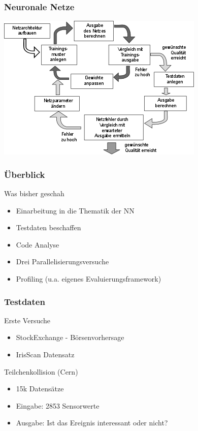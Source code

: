 \documentclass[18pt]{beamer}
\begin{document}
	\begin{frame}[c]\frametitle{Neuronale Netze}
		\begin{center}
		\includegraphics[scale=.7]{images/workflow.png}
		\end{center}
	\end{frame}		

	\begin{frame}[c]\frametitle{Überblick}
		\begin{block}{Was bisher geschah}
		    \begin{itemize}
		    	\item Einarbeitung in die Thematik der NN
			    \item Testdaten beschaffen
		    	\item Code Analyse
		    	\item Drei Parallelisierungsversuche
		    	\item Profiling (u.a. eigenes Evaluierungsframework)
		    \end{itemize}		    
		\end{block}
	\end{frame}
	
	\begin{frame}[c]\frametitle{Testdaten}
		\begin{block}{Erste Versuche}
		    \begin{itemize}
		    	\item StockExchange - Börsenvorhersage
		    	\item IrisScan Datensatz
		    \end{itemize}
		\end{block}
		\begin{block}{Teilchenkollision (Cern)}
		    \begin{itemize}
		    	\item 15k Datensätze
		    	\item Eingabe: 2853 Sensorwerte
				\item Ausgabe: Ist das Ereignis interessant oder nicht? 
		    \end{itemize}
		\end{block}		
	\end{frame}
\end{document}

